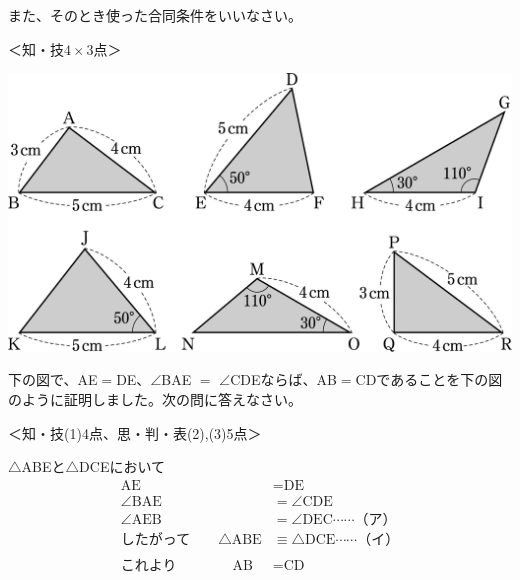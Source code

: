 \documentclass[
  12pt,a4paper,lualatex,ja=standard]{bxjsarticle}
\begin{document}
\begin{flushleft}
また、そのとき使った合同条件をいいなさい。

%
\begin{flushright}%
\footnotesize{＜知・技$4\times 3$点＞}%
\end{flushright}%


\begin{center}
\def\@captype{figure}
\includegraphics{image71.png}

\vfill
\end{center}

\newpage
\noindent{} \hspace{1pt}下の図で、AE$=$DE、$\angle$BAE $=$ $\angle$CDEならば、AB$=$CDであることを下の図のように証明しました。次の問に答えなさい。

%
\begin{flushright}%
\footnotesize{＜知・技(1)4点、思・判・表(2),(3)5点＞}%
\end{flushright}%


\begin{multicols}{2}
\begin{screen}
$\triangle$ABEと$\triangle$DCEにおいて
\begin{alignat*}{3}
 \mbox{AE} &= \mbox{DE} \\
 \angle \mbox{BAE} &= \angle \mbox{CDE} \\
 \angle \mbox{AEB} &= \angle \mbox{DEC} \cdots \cdots \mbox{（ア）} \\
 \mbox{したがって} \qquad \triangle \mbox{ABE} &\equiv \triangle \mbox{DCE}\cdots \cdots \mbox{（イ）} \\\\
 \mbox{これより} \qquad \qquad \mbox{AB} &= \mbox{CD}
\end{alignat*}
\end{screen}


\end{multicols}
\end{flushleft}
\end{document}
